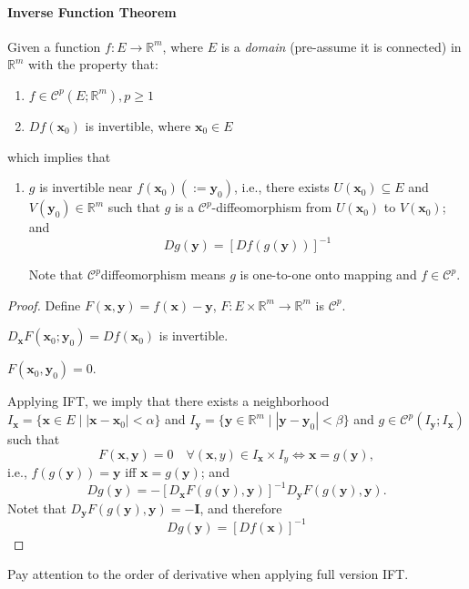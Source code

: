 \paragraph{Inverse Function Theorem}
\begin{theorem}
Given a function $f:E\to\mathbb{R}^m$, where $E$ is a \emph{domain} (pre-assume it is connected) in $\mathbb{R}^m$ with the property that:
\begin{enumerate}
\item
$f\in\mathcal{C}^p(E;\mathbb{R}^m), p\ge1$
\item
$Df(\bm x_0)$ is invertible, where $\bm x_0\in E$
\end{enumerate}
which implies that
\begin{enumerate}
\item
$g$ is invertible near $f(\bm x_0)(:=\bm y_0)$, i.e., there exists $U(\bm x_0)\subseteq E$ and $V(\bm y_0)\in\mathbb{R}^m$ such that $g$ is a $\mathcal{C}^p$-diffeomorphism from $U(\bm x_0)$ to $V(\bm x_0)$; and
\[
Dg(\bm y)=[Df(g(\bm y))]^{-1}
\]

Note that $\mathcal{C}^p$diffeomorphism means $g$ is one-to-one onto mapping and $f\in\mathcal{C}^p$.
\end{enumerate}
\end{theorem}
\begin{proof}
Define $F(\bm x,\bm y)=f(\bm x)-\bm y$, $F:E\times\mathbb{R}^m\to\mathbb{R}^m$ is $\mathcal{C}^p$.

$D_{\bm x}F(\bm x_0;\bm y_0) = Df(\bm x_0)$ is invertible.

$F(\bm x_0,\bm y_0)=0$.

Applying IFT, we imply that there exists a neighborhood $I_{\bm x}=\{\bm x\in E\mid |\bm x-\bm x_0|<\alpha\}$ and $I_{\bm y}=\{\bm y\in\mathbb{R}^m\mid |\bm y-\bm y_0|<\beta\}$ and $g\in\mathcal{C}^p(I_{\bm y};I_{\bm x})$ such that
\[
F(\bm x,\bm y)=0\quad\forall (\bm x,y)\in I_{\bm x}\times I_y\Longleftrightarrow
\bm x=g(\bm y),
\]
i.e., $f(g(\bm y))=\bm y$ iff $\bm x=g(\bm y)$; and
\[
Dg(\bm y)=-[D_{\bm x}F(g(\bm y), \bm y)]^{-1}D_{\bm y}F(g(\bm y),\bm y).
\]
Notet that $D_{\bm y}F(g(\bm y),\bm y)=-\bm I$, and therefore
\[
Dg(\bm y)=[Df(\bm x)]^{-1}
\]
\end{proof}
Pay attention to the order of derivative when applying full version IFT.

